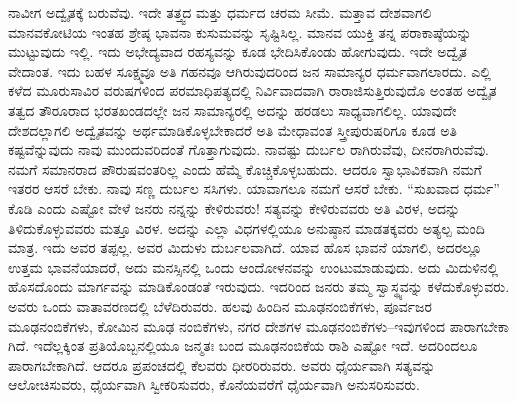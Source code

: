 ನಾವೀಗ ಅದ್ವೈತಕ್ಕೆ ಬರುವೆವು. ಇದೇ ತತ್ತ್ವದ ಮತ್ತು ಧರ್ಮದ ಚರಮ ಸೀಮೆ. ಮತ್ತಾವ ದೇಶವಾಗಲಿ ಮಾನವಕೋಟಿಯ ಇಂತಹ ಶ್ರೇಷ್ಠ ಭಾವನಾ ಕುಸುಮವನ್ನು ಸೃಷ್ಟಿಸಿಲ್ಲ. ಮಾನವ ಯುಕ್ತಿ ತನ್ನ ಪರಾಕಾಷ್ಠೆಯನ್ನು ಮುಟ್ಟುವುದು ಇಲ್ಲಿ. ಇದು ಅಭೇದ್ಯವಾದ ರಹಸ್ಯವನ್ನು ಕೂಡ ಭೇದಿಸಿಕೊಂಡು ಹೋಗುವುದು. ಇದೇ ಅದ್ವೈತ ವೇದಾಂತ. ಇದು ಬಹಳ ಸೂಕ್ಷ್ಮವೂ ಅತಿ ಗಹನವೂ ಆಗಿರುವುದರಿಂದ ಜನ ಸಾಮಾನ್ಯರ ಧರ್ಮವಾಗಲಾರದು. ಎಲ್ಲಿ ಕಳೆದ ಮೂರುಸಾವಿರ ವರುಷಗಳಿಂದ ಪರಮಾಧಿಪತ್ಯದಲ್ಲಿ ನಿರ್ವಿವಾದವಾಗಿ ರಾರಾಜಿಸುತ್ತಿರುವುದೊ ಅಂತಹ ಅದ್ವೈತ ತತ್ವದ ತೌರೂರಾದ ಭರತಖಂಡದಲ್ಲೇ ಜನ ಸಾಮಾನ್ಯರಲ್ಲಿ ಅದನ್ನು ಹರಡಲು ಸಾಧ್ಯವಾಗಲಿಲ್ಲ. ಯಾವುದೇ ದೇಶದಲ್ಲಾಗಲಿ ಅದ್ವೈತವನ್ನು ಅರ್ಥಮಾಡಿಕೊಳ್ಳಬೇಕಾದರೆ ಅತಿ ಮೇಧಾವಂತ ಸ್ತ್ರೀಪುರುಷರಿಗೂ ಕೂಡ ಅತಿ ಕಷ್ಟವೆನ್ನುವುದು ನಾವು ಮುಂದುವರಿದಂತೆ ಗೊತ್ತಾಗುವುದು. ನಾವಷ್ಟು ದುರ್ಬಲ ರಾಗಿರುವೆವು, ದೀನರಾಗಿರುವೆವು. ನಮಗೆ ಸಮಾನರಾದ ಪೌರುಷವಂತರಿಲ್ಲ ಎಂದು ಹೆಮ್ಮೆ ಕೊಚ್ಚಿಕೊಳ್ಳಬಹುದು. ಆದರೂ ಸ್ವಾಭಾವಿಕವಾಗಿ ನಮಗೆ ಇತರರ ಆಸರೆ ಬೇಕು. ನಾವು ಸಣ್ಣ ದುರ್ಬಲ ಸಸಿಗಳು. ಯಾವಾಗಲೂ ನಮಗೆ ಆಸರೆ ಬೇಕು. “ಸುಖವಾದ ಧರ್ಮ” ಕೊಡಿ ಎಂದು ಎಷ್ಟೋ ವೇಳೆ ಜನರು ನನ್ನನ್ನು ಕೇಳಿರುವರು! ಸತ್ಯವನ್ನು ಕೇಳಿರುವವರು ಅತಿ ವಿರಳ, ಅದನ್ನು ತಿಳಿದುಕೊಳ್ಳುವವರು ಮತ್ತೂ ವಿರಳ. ಅದನ್ನು ಎಲ್ಲಾ ವಿಧಗಳಲ್ಲಿಯೂ ಅನುಷ್ಠಾನ ಮಾಡತಕ್ಕವರು ಅತ್ಯಲ್ಪ ಮಂದಿ ಮಾತ್ರ. ಇದು ಅವರ ತಪ್ಪಲ್ಲ. ಅವರ ಮಿದುಳು ದುರ್ಬಲವಾಗಿದೆ. ಯಾವ ಹೊಸ ಭಾವನೆ ಯಾಗಲಿ, ಅದರಲ್ಲೂ ಉತ್ತಮ ಭಾವನೆಯಾದರೆ, ಅದು ಮನಸ್ಸಿನಲ್ಲಿ ಒಂದು ಆಂದೋಳನವನ್ನು ಉಂಟುಮಾಡುವುದು. ಅದು ಮಿದುಳಿನಲ್ಲಿ ಹೊಸದೊಂದು ಮಾರ್ಗವನ್ನು ಮಾಡಿಕೊಂಡಂತೆ ಇರುವುದು. ಇದರಿಂದ ಜನರು ತಮ್ಮ ಸ್ವಾಸ್ಥ್ಯವನ್ನು ಕಳೆದುಕೊಳ್ಳುವರು. ಅವರು ಒಂದು ವಾತಾವರಣದಲ್ಲಿ ಬೆಳೆದಿರುವರು. ಹಲವು ಹಿಂದಿನ ಮೂಢನಂಬಿಕೆಗಳು, ಪೂರ್ವಜರ ಮೂಢನಂಬಿಕೆಗಳು, ಕೋಮಿನ ಮೂಢ ನಂಬಿಕೆಗಳು, ನಗರ ದೇಶಗಳ ಮೂಢನಂಬಿಕೆಗಳು–ಇವುಗಳಿಂದ ಪಾರಾಗಬೇಕಾ ಗಿದೆ. ಇದೆಲ್ಲಕ್ಕಿಂತ ಪ್ರತಿಯೊಬ್ಬನಲ್ಲಿಯೂ ಜನ್ಮತಃ ಬಂದ ಮೂಢನಂಬಿಕೆಯ ರಾಶಿ ಎಷ್ಟೋ ಇದೆ. ಅದರಿಂದಲೂ ಪಾರಾಗಬೇಕಾಗಿದೆ. ಆದರೂ ಪ್ರಪಂಚದಲ್ಲಿ ಕೆಲವರು ಧೀರರಿರುವರು. ಅವರು ಧೈರ್ಯವಾಗಿ ಸತ್ಯವನ್ನು ಆಲೋಚಿಸುವರು, ಧೈರ್ಯವಾಗಿ ಸ್ವೀಕರಿಸುವರು, ಕೊನೆಯವರೆಗೆ ಧೈರ್ಯವಾಗಿ ಅನುಸರಿಸುವರು.

